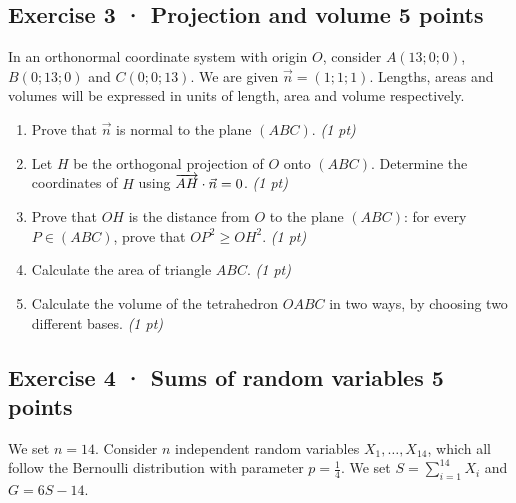 \clearpage{}\par

\subsection*{Exercise 3 · Projection and volume \hfill 5 points}In an orthonormal coordinate system with origin $O$, consider $A(13;0;0)$, $B(0;13;0)$ and $C(0;0;13)$. We are given $\vec n=(1;1;1)$. Lengths, areas and volumes will be expressed in units of length, area and volume respectively.

\begin{enumerate}

\item Prove that $\vec n$ is normal to the plane $(ABC)$. \hfill\textit{(1 pt)}

\item Let $H$ be the orthogonal projection of $O$ onto $(ABC)$. Determine the coordinates of $H$ using $\overrightarrow{AH}\cdot\vec n=0$. \hfill\textit{(1 pt)}

\item Prove that $OH$ is the distance from $O$ to the plane $(ABC)$: for every $P\in(ABC)$, prove that $OP^2\ge OH^2$. \hfill\textit{(1 pt)}

\item Calculate the area of triangle $ABC$. \hfill\textit{(1 pt)}

\item Calculate the volume of the tetrahedron $OABC$ in two ways, by choosing two different bases. \hfill\textit{(1 pt)}

\end{enumerate}

\subsection*{Exercise 4 · Sums of random variables \hfill 5 points}We set $n=14$. Consider $n$ independent random variables $X_1,\ldots,X_{14}$, which all follow the Bernoulli distribution with parameter $p=\frac{1}{4}$. We set $S=\displaystyle\sum_{i=1}^{14}X_i$ and $G=6S-14$.

